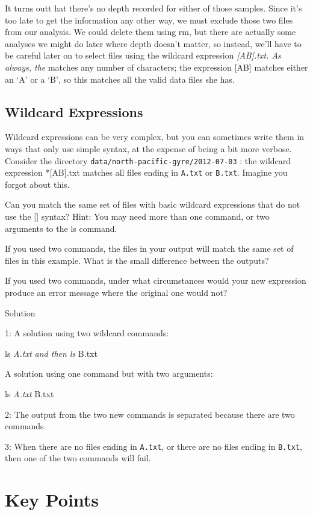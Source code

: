 \documentclass[
]{book}
\begin{document}
It turns outt hat there's no depth recorded for either of those samples. Since it's too late to get the information any other way, we must exclude those two files from our analysis. We could delete them using rm, but there are actually some analyses we might do later where depth doesn't matter, so instead, we'll have to be careful later on to select files using the wildcard expression \emph{{[}AB{]}.txt. As always, the } matches any number of characters; the expression {[}AB{]} matches either an `A' or a `B', so this matches all the valid data files she has.

\subsection{Wildcard Expressions}\label{wildcard-expressions}

Wildcard expressions can be very complex, but you can sometimes write them in ways that only use simple syntax, at the expense of being a bit more verbose. Consider the directory \texttt{data/north-pacific-gyre/2012-07-03} : the wildcard expression *{[}AB{]}.txt matches all files ending in \texttt{A.txt} or \texttt{B.txt}. Imagine you forgot about this.

Can you match the same set of files with basic wildcard expressions that do not use the {[}{]} syntax? Hint: You may need more than one command, or two arguments to the ls command.

If you used two commands, the files in your output will match the same set of files in this example. What is the small difference between the outputs?

If you used two commands, under what circumstances would your new expression produce an error message where the original one would not?

Solution

1: A solution using two wildcard commands:

ls \emph{A.txt and then ls }B.txt

A solution using one command but with two arguments:

ls \emph{A.txt }B.txt

2: The output from the two new commands is separated because there are two commands.

3: When there are no files ending in \texttt{A.txt}, or there are no files ending in \texttt{B.txt}, then one of the two commands will fail.

\section{Key Points}\label{key-points}
\end{document}
